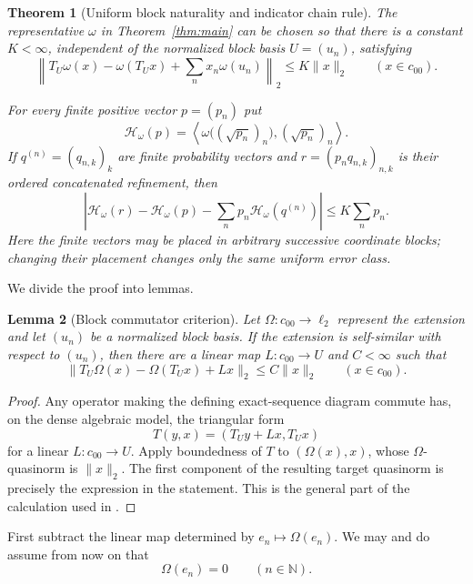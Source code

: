 \documentclass[11pt]{article}
\newtheorem{theorem}{Theorem}
\newtheorem{lemma}[theorem]{Lemma}
\newcommand{\czz}{c_{00}}
\begin{document}
\begin{theorem}[Uniform block naturality and indicator chain rule]
\label{thm:uniform-block}
The representative $\omega$ in Theorem~\ref{thm:main} can be chosen so that
there is a constant $K<\infty$, independent of the normalized block basis
$U=(u_n)$, satisfying
\begin{equation}\label{eq:uniform-canonical}
 \left\|T_U\omega(x)-\omega(T_Ux)+
       \sum_nx_n\omega(u_n)\right\|_2
 \le K\|x\|_2 \qquad(x\in\czz).
\end{equation}

For every finite positive vector $p=(p_n)$ put
\[
 \mathcal H_\omega(p)=
 \left\langle\omega\big((\sqrt {p_n})_n\big),
                     (\sqrt {p_n})_n\right\rangle .
\]
If $q^{(n)}=(q_{n,k})_k$ are finite probability vectors and
$r=(p_nq_{n,k})_{n,k}$ is their ordered concatenated refinement, then
\begin{equation}\label{eq:entropy-chain}
 \left|\mathcal H_\omega(r)-\mathcal H_\omega(p)
       -\sum_np_n\mathcal H_\omega(q^{(n)})\right|
 \le K\sum_np_n .
\end{equation}
Here the finite vectors may be placed in arbitrary successive coordinate
blocks; changing their placement changes only the same uniform error class.
\end{theorem}

We divide the proof into lemmas.

\begin{lemma}[Block commutator criterion]\label{lem:blockcriterion}
Let $\Omega:\czz\to\ell_2$ represent the extension and let $(u_n)$ be a
normalized block basis.  If the extension is self-similar with respect to
$(u_n)$, then there are a linear map $L:\czz\to U$ and $C<\infty$ such that
\[
 \|T_U\Omega(x)-\Omega(T_Ux)+Lx\|_2\le C\|x\|_2
 \qquad(x\in\czz).
\]
\end{lemma}

\begin{proof}
Any operator making the defining exact-sequence diagram commute has, on the
dense algebraic model, the triangular form
\[
 T(y,x)=(T_Uy+Lx,T_Ux)
\]
for a linear $L:\czz\to U$.  Apply boundedness of $T$ to
$(\Omega(x),x)$, whose $\Omega$-quasinorm is $\|x\|_2$.  The first component
of the resulting target quasinorm is precisely the expression in the
statement.  This is the general part of the calculation used in
\cite[Lemma 7.1]{CDR}.
\end{proof}

First subtract the linear map determined by $e_n\mapsto\Omega(e_n)$.  We may
and do assume from now on that
\begin{equation}\label{eq:zero-basis}
 \Omega(e_n)=0 \qquad(n\in\mathbb N).
\end{equation}
\end{document}
